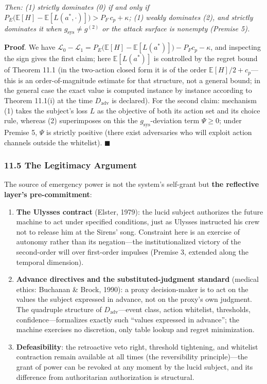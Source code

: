 \documentclass[
  11pt]{article}
\providecommand{\tightlist}{%
  \setlength{\itemsep}{0pt}\setlength{\parskip}{0pt}}
\begin{document}
\emph{Then: (1) strictly dominates (0) if and only if
\(P_E\big(\mathbb{E}[H] - \mathbb{E}[L(a^*,\cdot)]\big) > P_F\, c_p + \kappa\);
(1) weakly dominates (2), and strictly dominates it when
\(g_{\mathrm{sys}} \ne g^{(2)}\) or the attack surface is nonempty
(Premise 5).}

\textbf{Proof}. We have
\(\mathcal{L}_0 - \mathcal{L}_1 = P_E\big(\mathbb{E}[H] - \mathbb{E}[L(a^*)]\big) - P_F c_p - \kappa\),
and inspecting the sign gives the first claim; here
\(\mathbb{E}[L(a^*)]\) is controlled by the regret bound of Theorem 11.1
(in the two-action closed form it is of the order
\(\mathbb{E}[H]/2 + c_p\)---this is an order-of-magnitude estimate for
that structure, not a general bound; in the general case the exact value
is computed instance by instance according to Theorem 11.1(i) at the
time \(D_{\mathrm{adv}}\) is declared). For the second claim: mechanism
(1) takes the subject's loss \(L\) as the objective of both its action
set and its choice rule, whereas (2) superimposes on this the
\(g_{\mathrm{sys}}\)-deviation term \(\Psi \ge 0\); under Premise 5,
\(\Psi\) is strictly positive (there exist adversaries who will exploit
action channels outside the whitelist). \(\blacksquare\)

\subsubsection{11.5 The Legitimacy
Argument}\label{the-legitimacy-argument}

The source of emergency power is not the system's self-grant but
\textbf{the reflective layer's pre-commitment}:

\begin{enumerate}
\def\labelenumi{\arabic{enumi}.}
\tightlist
\item
  \textbf{The Ulysses contract} (Elster, 1979): the lucid subject
  authorizes the future machine to act under specified conditions, just
  as Ulysses instructed his crew not to release him at the Sirens' song.
  Constraint here is an exercise of autonomy rather than its
  negation---the institutionalized victory of the second-order will over
  first-order impulses (Premise 3, extended along the temporal
  dimension).
\item
  \textbf{Advance directives and the substituted-judgment standard}
  (medical ethics: Buchanan \& Brock, 1990): a proxy decision-maker is
  to act on the values the subject expressed in advance, not on the
  proxy's own judgment. The quadruple structure of
  \(D_{\mathrm{adv}}\)---event class, action whitelist, thresholds,
  confidence---formalizes exactly such ``values expressed in advance'';
  the machine exercises no discretion, only table lookup and regret
  minimization.
\item
  \textbf{Defeasibility}: the retroactive veto right, threshold
  tightening, and whitelist contraction remain available at all times
  (the reversibility principle)---the grant of power can be revoked at
  any moment by the lucid subject, and its difference from authoritarian
  authorization is structural.
\end{enumerate}
\end{document}
